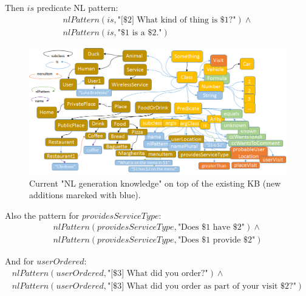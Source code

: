 Then $is$ predicate NL pattern:
\begin{equation}\label{as:nl:is}
\begin{gathered}
    nlPattern(is,\text{"[\$2] What kind of thing is \$1?"}) \land \\
    nlPattern(is,\text{"\$1 is a \$2."})
\end{gathered}
\end{equation}

\begin{figure}[H]
	\centering
		\includegraphics[width=1\textwidth]{figures/LogicToNLOntology.png}
	\caption{Current "NL generation knowledge" on top of the existing KB (new
    additions mareked with blue).}
	\label{fig:nlKB}
\end{figure}

Also the pattern for $providesServiceType$:
\begin{equation}\label{as:nl:providesServiceType}
\begin{gathered}
    nlPattern(providesServiceType,\text{"Does \$1 have \$2"}) \land \\
    nlPattern(providesServiceType,\text{"Does \$1 provide \$2"})
\end{gathered}
\end{equation}

And for $userOrdered$:
\begin{equation}\label{as:nl:userOrdered}
\begin{gathered}
    nlPattern(userOrdered,\text{"[\$3] What did you order?"}) \land \\
    nlPattern(userOrdered,\text{"[\$3] What did you order as part of your visit \$2?"}) \\
\end{gathered}
\end{equation}



